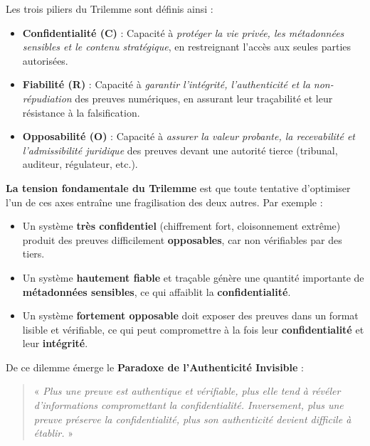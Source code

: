 \documentclass[11pt]{article}
\begin{document}
\vspace{0.5cm}

\noindent Les trois piliers du Trilemme sont définis ainsi :

\begin{itemize}
    \item \textbf{Confidentialité (C)} : Capacité à \textit{protéger la vie privée, les métadonnées sensibles et le contenu stratégique}, en restreignant l'accès aux seules parties autorisées.
    \item \textbf{Fiabilité (R)} : Capacité à \textit{garantir l'intégrité, l'authenticité et la non-répudiation} des preuves numériques, en assurant leur traçabilité et leur résistance à la falsification.
    \item \textbf{Opposabilité (O)} : Capacité à \textit{assurer la valeur probante, la recevabilité et l’admissibilité juridique} des preuves devant une autorité tierce (tribunal, auditeur, régulateur, etc.).
\end{itemize}

\vspace{0.5cm}

\noindent \textbf{La tension fondamentale du Trilemme} est que toute tentative d’optimiser l’un de ces axes entraîne une fragilisation des deux autres.  
Par exemple :
\begin{itemize}
    \item Un système \textbf{très confidentiel} (chiffrement fort, cloisonnement extrême) produit des preuves difficilement \textbf{opposables}, car non vérifiables par des tiers.
    \item Un système \textbf{hautement fiable} et traçable génère une quantité importante de \textbf{métadonnées sensibles}, ce qui affaiblit la \textbf{confidentialité}.
    \item Un système \textbf{fortement opposable} doit exposer des preuves dans un format lisible et vérifiable, ce qui peut compromettre à la fois leur \textbf{confidentialité} et leur \textbf{intégrité}.
\end{itemize}

\vspace{0.5cm}

De ce dilemme émerge le \textbf{Paradoxe de l'Authenticité Invisible} :  
\begin{quote}
« \textit{Plus une preuve est authentique et vérifiable, plus elle tend à révéler d'informations compromettant la confidentialité. Inversement, plus une preuve préserve la confidentialité, plus son authenticité devient difficile à établir.} »
\end{quote}
\end{document}

